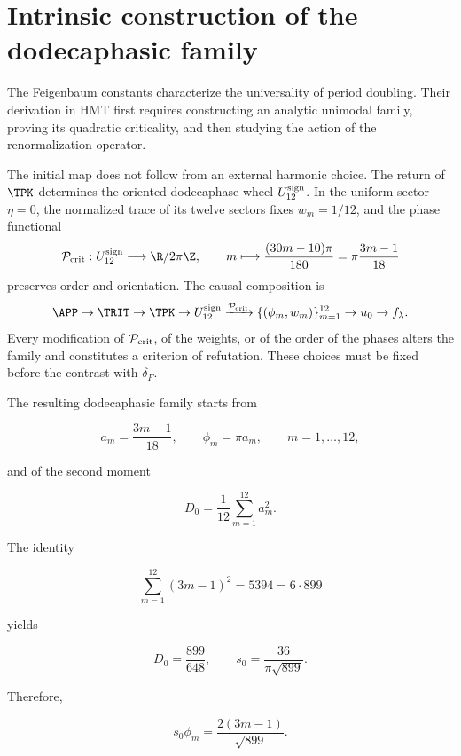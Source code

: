 \label{mab:rm:ch:chaos}

\section{Intrinsic construction of the dodecaphasic family}

The Feigenbaum constants characterize the universality of period
doubling. Their derivation in HMT first requires constructing
an analytic unimodal family, proving its quadratic criticality, and
then studying the action of the renormalization operator.

The initial map does not follow from an external harmonic choice. The return
of \(\TPK\) determines the oriented dodecaphase wheel
\(U_{12}^{\rm sign}\). In the uniform sector \(\eta=0\), the normalized
trace of its twelve sectors fixes \(w_m=1/12\), and the phase functional
\begin{equation}
\mathcal P_{\rm crit}:U_{12}^{\rm sign}\longrightarrow\R/2\pi\Z,
\qquad
m\longmapsto \frac{(30m-10)\pi}{180}
=\pi\frac{3m-1}{18}
\label{mab:rm:eq:critical-phase-reader}
\end{equation}
preserves order and orientation. The causal composition is
\[
\APP\to\TRIT\to\TPK\to U_{12}^{\rm sign}
\xrightarrow{\mathcal P_{\rm crit}}
\{(\phi_m,w_m)\}_{m=1}^{12}
\to u_0\to f_\lambda.
\]
Every modification of \(\mathcal P_{\rm crit}\), of the weights, or of the order of
the phases alters the family and constitutes a criterion of refutation. These
choices must be fixed before the contrast with \(\delta_F\).

The resulting dodecaphasic family starts from

\[
a_m=\frac{3m-1}{18},\qquad
\phi_m=\pi a_m,\qquad m=1,\ldots,12,
\]

and of the second moment

\[
D_0=\frac1{12}\sum_{m=1}^{12}a_m^2.
\]

The identity

\begin{equation}
\sum_{m=1}^{12}(3m-1)^2=5394=6\cdot899
\label{mab:rm:eq:chaos-sum2}
\end{equation}

yields

\[
D_0=\frac{899}{648},\qquad
s_0=\frac{36}{\pi\sqrt{899}}.
\]

Therefore,

\begin{equation}
s_0\phi_m=\frac{2(3m-1)}{\sqrt{899}}.
\label{mab:rm:eq:pi-cancellation}
\end{equation}

